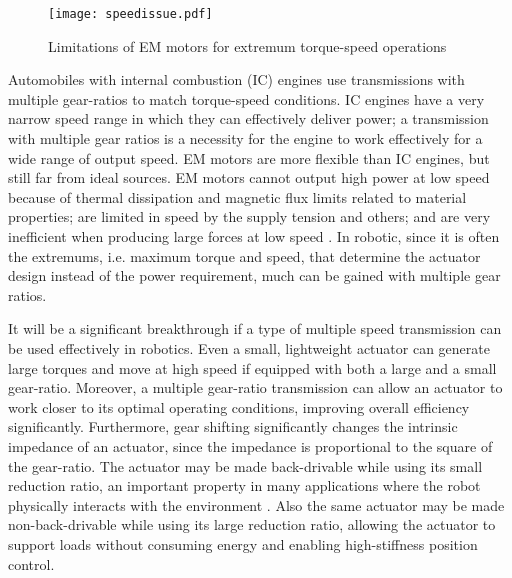\begin{figure}[htp]
	\centering
		\texttt{[image: speedissue.pdf]}
	\caption{Limitations of EM motors for extremum torque-speed operations}
	\label{fig:speedissue}
\end{figure}


Automobiles with internal combustion (IC) engines use transmissions with multiple gear-ratios to match torque-speed conditions. IC engines have a very narrow speed range in which they can effectively deliver power; a transmission with multiple gear ratios is a necessity for the engine to work effectively for a wide range of output speed. EM motors are more flexible than IC engines, but still far from ideal sources. EM motors cannot output high power at low speed because of thermal dissipation and magnetic flux limits related to material properties; are limited in speed by the supply tension and others; and are very inefficient when producing large forces at low speed \cite{hollerbach_comparative_1992}. In robotic, since it is often the extremums, i.e. maximum torque and speed, that determine the actuator design instead of the power requirement, much can be gained with multiple gear ratios.

It will be a significant breakthrough if a type of multiple speed transmission can be used effectively in robotics. Even a small, lightweight actuator can generate large torques and move at high speed if equipped with both a large and a small gear-ratio. Moreover, a multiple gear-ratio transmission can allow an actuator to work closer to its optimal operating conditions, improving overall efficiency significantly. Furthermore, gear shifting significantly changes the intrinsic impedance of an actuator, since the impedance is proportional to the square of the gear-ratio. The actuator may be made back-drivable while using its small reduction ratio, an important property in many applications where the robot physically interacts with the environment \cite{hogan_impedance_2004}. Also the same actuator may be made non-back-drivable while using its large reduction ratio, allowing the actuator to support loads without consuming energy and enabling high-stiffness position control.



